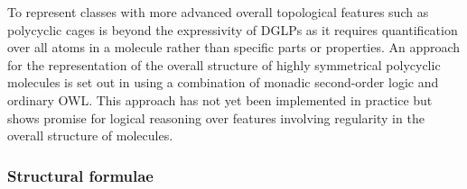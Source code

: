 \documentclass[10pt]{bmc_article}
\newenvironment{bmcformat}{\baselineskip20pt\sloppy\setboolean{publ}{false}}{\baselineskip20pt\sloppy}
\begin{document}
\begin{bmcformat}
% 
%  
% 

To represent classes with more advanced overall topological features such as polycyclic cages is beyond the expressivity of DGLPs as it requires quantification over all atoms in a molecule rather than specific parts or properties. An approach for the representation of the overall structure of highly symmetrical polycyclic molecules is set out in \cite{hastings2011} using a combination of monadic second-order logic and ordinary OWL.  This approach has not yet been implemented in practice but shows promise for logical reasoning over features involving regularity in the overall structure of molecules. 
  
\subsubsection*{Structural formulae}  
\label{subsubsec:entire}


\end{bmcformat}
\end{document}
